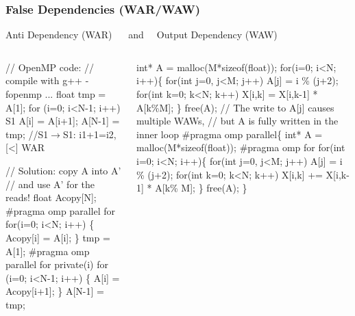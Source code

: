 \documentclass{beamer}
\renewcommand{\emph}[1]{\textcolor{structure}{#1}}
\newcommand{\emp}[1]{\textcolor{DikuRed}{ #1}}
\newcommand{\mymath}[1]{$ #1 $}
\begin{document}
\begin{frame}[fragile,t]
  \frametitle{False Dependencies (WAR/WAW)} 

\begin{block}{Anti Dependency (WAR) {\tt~~} and {\tt~~}Output Dependency (WAW)}
\begin{columns}
\begin{colorcode}[fontsize=\scriptsize]
// \alert{OpenMP code:} 
// \alert{compile with g++ -fopenmp ...}
  float tmp = A[1];
  \emp{for (i=0; i<N-1; i++)}
\emp{S1  A[i] = A[i+1];} 
  A[N-1] = tmp;
//S1\mymath{\rightarrow}S1: i1+1=i2, \emp{[<]} WAR\pause

// Solution: copy A into A'
// and use A' for the reads!
float Acopy[N];
\#pragma omp parallel for
  \emph{for(i=0; i<N; i++)} \{
    Acopy[i] = A[i];
  \}
  tmp = A[1];
\emph{\#pragma omp parallel for} \emp{private(i)}
  for (i=0; i<N-1; i++) \{
    \emph{A[i] = Acopy[i+1];}
  \}
  A[N-1] = tmp;
\end{colorcode}

\begin{colorcode}[fontsize=\scriptsize]
  int* A = malloc(M*sizeof(float));
  for(i=0; i<N; i++)\{
    for(int j=0, j<M; j++)
        \emp{A[j]} = i \% (j+2);
    for(int k=0; k<N; k++)
        X[i,k] = X[i,k-1] * \emp{A[k\%M]};
  \}
  free(A);
// \emp{The write to A[j] causes multiple WAWs},\pause
// \emph{but A is fully written in the inner loop} 
\emph{\#pragma omp parallel}\{
  int* A = malloc(M*sizeof(float));
\emph{\#pragma omp for}
  for(int i=0; i<N; i++)\{
    for(int j=0, j<M; j++)
        \emp{A[j]} = i \% (j+2);
    for(int k=0; k<N; k++)
        X[i,k] += X[i,k-1] * \emp{A[k\% M]};
  \}
  free(A);
\}
\end{colorcode}
\end{columns}
\end{block}

\end{frame}
\end{document}
